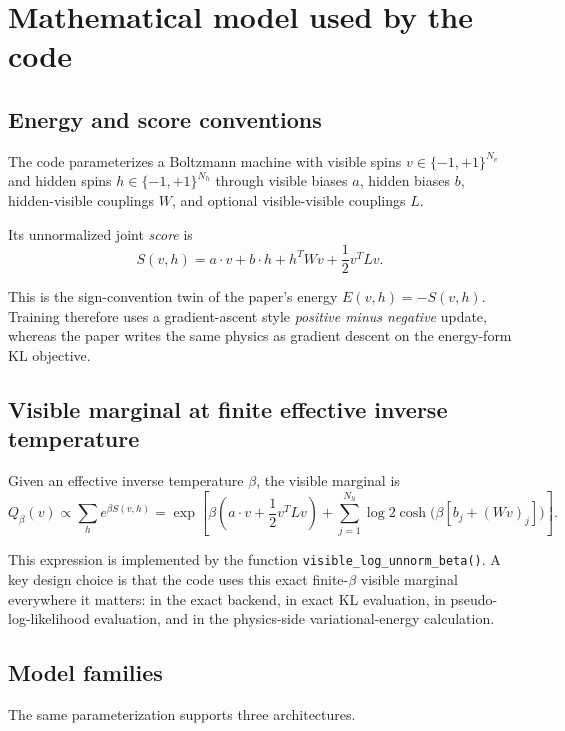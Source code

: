 \documentclass[11pt]{article}
\begin{document}
\section{Mathematical model used by the code}

\subsection{Energy and score conventions}

The code parameterizes a Boltzmann machine with visible spins
$v\in\{-1,+1\}^{N_v}$ and hidden spins $h\in\{-1,+1\}^{N_h}$ through
visible biases $a$, hidden biases $b$, hidden-visible couplings $W$, and
optional visible-visible couplings $L$.

Its unnormalized joint \emph{score} is
\begin{equation}
S(v,h)=a\cdot v+b\cdot h+h^T W v + \frac{1}{2} v^T L v.
\end{equation}

This is the sign-convention twin of the paper's energy
$E(v,h)= -S(v,h)$. Training therefore uses a gradient-ascent style
\emph{positive minus negative} update, whereas the paper writes the same physics
as gradient descent on the energy-form KL objective.

\subsection{Visible marginal at finite effective inverse temperature}

Given an effective inverse temperature $\beta$, the visible marginal is
\begin{equation}
Q_\beta(v) \propto \sum_h e^{\beta S(v,h)}
= \exp\left[\beta\left(a\cdot v + \frac12 v^T L v\right)
+ \sum_{j=1}^{N_h} \log 2\cosh\!\big(\beta[b_j + (Wv)_j]\big)\right].
\end{equation}

This expression is implemented by the function
\texttt{visible\_log\_unnorm\_beta()}. A key design choice is that the code uses
this exact finite-$\beta$ visible marginal everywhere it matters: in the exact
backend, in exact KL evaluation, in pseudo-log-likelihood evaluation, and in the
physics-side variational-energy calculation.

\subsection{Model families}

The same parameterization supports three architectures.
\end{document}
